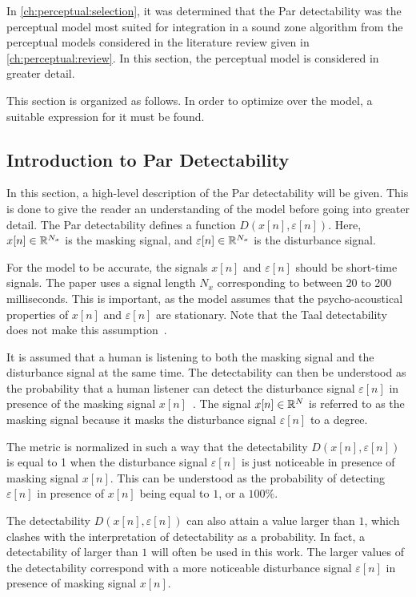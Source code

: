 In \autoref{ch:perceptual:selection}, it was determined that the Par detectability was the perceptual model
most suited for integration in a sound zone algorithm from the perceptual models considered in 
the literature review given in \autoref{ch:perceptual:review}.
In this section, the perceptual model is considered in greater detail.

This section is organized as follows.
In order to optimize over the model, a suitable expression for it must be found.

\subsection{Introduction to Par Detectability}
\label{ch:perceptual:implementation:intuition}
In this section, a high-level description of the Par detectability will be given.
This is done to give the reader an understanding of the model before going into greater detail.
The Par detectability defines a function $D(x[n],\varepsilon[n])$.
Here, $x[n]\in\mathbb{R}^{N_x}$ is the masking signal, and $\varepsilon[n]\in\mathbb{R}^{N_x}$ is the disturbance signal.

For the model to be accurate, the signals $x[n]$ and $\varepsilon[n]$ should be short-time signals.
The paper uses a signal length $N_x$ corresponding to between 20 to 200 milliseconds.    
This is important, as the model assumes that the psycho-acoustical properties of $x[n]$ and $\varepsilon[n]$ are stationary.  
Note that the Taal detectability does not make this assumption~\cite{taal2012low}.

It is assumed that a human is listening to both the masking signal and the disturbance signal at the same time.
The detectability can then be understood as the probability that a human listener can detect the disturbance signal 
$\varepsilon[n]$ in presence of the masking signal $x[n]$~\cite{van2005perceptual}.
The signal $x[n]\in\mathbb{R}^{N}$ is referred to as the masking signal because it masks the disturbance signal 
$\varepsilon[n]$ to a degree.

The metric is normalized in such a way that the detectability $D(x[n],\varepsilon[n])$ is equal to 1 when the 
disturbance signal $\varepsilon[n]$ is just noticeable in presence of masking signal $x[n]$.
This can be understood as the probability of detecting $\varepsilon[n]$ in presence of $x[n]$ 
being equal to $1$, or a $100\%$.

The detectability $D(x[n],\varepsilon[n])$ can also attain a value larger than $1$, which clashes with the 
interpretation of detectability as a probability.
In fact, a detectability of larger than $1$ will often be used in this work.
The larger values of the detectability correspond with a more noticeable disturbance signal $\varepsilon[n]$ 
in presence of masking signal $x[n]$. 


